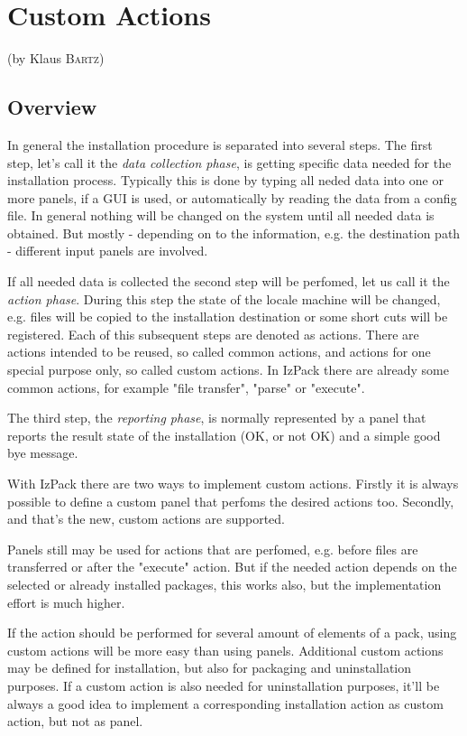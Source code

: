 


\chapter{\label{cha:customactions}Custom Actions} (by Klaus \textsc{Bartz})

\section{Overview}

In general the installation procedure is separated into several
steps. The first step, let's call it the \emph{data collection phase},
is getting specific data needed for the installation process.
Typically this is done by typing all neded data into one or more panels,
if a GUI is used, or automatically by reading the data from a config file.
In general nothing will be changed on the system until all needed data is
obtained. But mostly - depending on to the information, e.g. the
destination path - different input panels are involved.

If all needed data is collected the second step will be perfomed,
let us call it the \emph{action phase}. During this step the state of
the locale machine will be changed, e.g. files will be copied to
the installation destination or some short cuts will be registered.
Each of this subsequent steps are denoted as actions. There are actions
intended to be reused, so called common actions, and actions for one special
purpose only, so called custom actions. In IzPack there are already some
common actions, for example "file transfer", "parse" or "execute".

The third step, the \emph{reporting phase}, is normally
represented by a panel that reports the result state of the installation
(OK, or not OK) and a simple good bye message.

With IzPack there are two ways to implement custom actions. Firstly
it is always possible to define a custom panel that perfoms the desired
actions too. Secondly, and that's the new, custom actions are supported.

Panels still may be used for actions that are perfomed, e.g.
before files are transferred or after the "execute" action.
But if the needed action depends on the selected or already installed
packages, this works also, but the implementation effort is much higher.

If the action should be performed for several amount of elements of a
pack, using custom actions will be more easy than using panels.
Additional custom actions may be defined for installation, but also for
packaging and uninstallation purposes. If a custom action is also needed
for uninstallation purposes, it'll be always a good idea to implement a
corresponding installation action as custom action, but not as panel.

